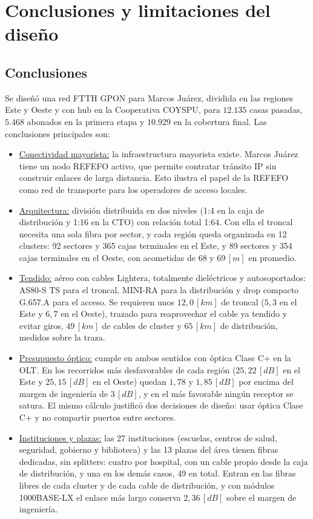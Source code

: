 \section{Conclusiones y limitaciones del diseño}
\label{sec:conclusiones}

\subsection{Conclusiones}
Se diseñó una red FTTH GPON para Marcos Juárez, dividida en las regiones Este y Oeste y con hub en la Cooperativa COYSPU, para $12.135$ casas pasadas, $5.468$ abonados en la primera etapa y $10.929$ en la cobertura final. Las conclusiones principales son:
\begin{itemize}
    \item \underline{Conectividad mayorista:} la infraestructura mayorista existe. Marcos Juárez tiene un nodo REFEFO activo, que permite contratar tránsito IP sin construir enlaces de larga distancia. Esto ilustra el papel de la REFEFO como red de transporte para los operadores de acceso locales.
    \item \underline{Arquitectura:} división distribuida en dos niveles (1:4 en la caja de distribución y 1:16 en la CTO) con relación total 1:64. Con ella el troncal necesita una sola fibra por sector, y cada región queda organizada en 12 clusters: 92 sectores y 365 cajas terminales en el Este, y 89 sectores y 354 cajas terminales en el Oeste, con acometidas de 68 y $69 \, [m]$ en promedio.
    \item \underline{Tendido:} aéreo con cables Lightera, totalmente dieléctricos y autosoportados: AS80-S TS para el troncal, MINI-RA para la distribución y drop compacto G.657.A para el acceso. Se requieren unos $12{,}0 \, [km]$ de troncal ($5{,}3$ en el Este y $6{,}7$ en el Oeste), trazado para reaprovechar el cable ya tendido y evitar giros, $49 \, [km]$ de cables de cluster y $65 \, [km]$ de distribución, medidos sobre la traza.
    \item \underline{Presupuesto óptico:} cumple en ambos sentidos con óptica Clase C+ en la OLT. En los recorridos más desfavorables de cada región ($25{,}22 \, [dB]$ en el Este y $25{,}15 \, [dB]$ en el Oeste) quedan $1{,}78$ y $1{,}85 \, [dB]$ por encima del margen de ingeniería de $3 \, [dB]$, y en el más favorable ningún receptor se satura. El mismo cálculo justificó dos decisiones de diseño: usar óptica Clase C+ y no compartir puertos entre sectores.
    \item \underline{Instituciones y plazas:} las 27 instituciones (escuelas, centros de salud, seguridad, gobierno y biblioteca) y las 13 plazas del área tienen fibras dedicadas, sin splitters: cuatro por hospital, con un cable propio desde la caja de distribución, y una en los demás casos, 49 en total. Entran en las fibras libres de cada cluster y de cada cable de distribución, y con módulos 1000BASE-LX el enlace más largo conserva $2{,}36 \, [dB]$ sobre el margen de ingeniería.

\end{itemize}
